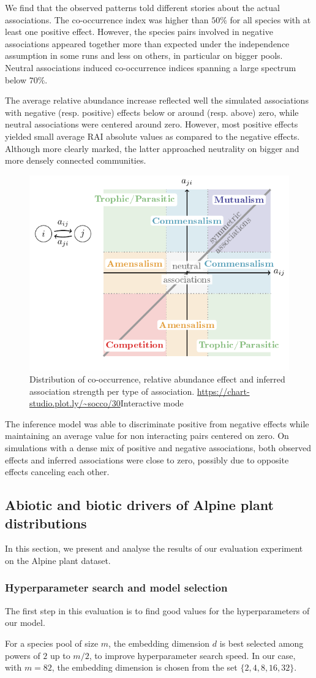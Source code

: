 \documentclass[10pt,a4paper]{article}
\newcommand{\inclPlt}[2]{\includegraphics[page=#1]{tikz_figures.pdf}}
\begin{document}
We find that the observed patterns told different stories about the actual associations. The co-occurrence index was higher than $50\%$ for all species with at least one positive effect. However, the species pairs involved in negative associations appeared together more than expected under the independence assumption in some runs and less on others, in particular on bigger pools. Neutral associations induced co-occurrence indices spanning a large spectrum below $70\%$. 

The average relative abundance increase reflected well the simulated associations with negative (resp. positive) effects below or around (resp. above) zero, while neutral associations were centered around zero. However, most positive effects yielded small average RAI absolute values as compared to the negative effects. Although more clearly marked, the latter approached neutrality on bigger and more densely connected communities.

\begin{figure}[bthp]
  \centering
    \inclPlt{6}{box_simul}
	\caption{Distribution of co-occurrence, relative abundance effect and inferred association strength per type of association. \url{https://chart-studio.plot.ly/~socco/30}{Interactive mode}}
	\label{patterns}
\end{figure}

The inference model was able to discriminate positive from negative effects while maintaining an average value for non interacting pairs centered on zero. On simulations with a dense mix of positive and negative associations, both observed effects and inferred associations were close to zero, possibly due to opposite effects canceling each other. 

\subsection{Abiotic and biotic drivers of Alpine plant distributions}

In this section, we present and analyse the results of our evaluation experiment on the Alpine plant dataset.

\subsubsection{Hyperparameter search and model selection}
The first step in this evaluation is to find good values for the hyperparameters of our model.

For a species pool of size $m$, the embedding dimension $d$ is best selected among powers of $2$ up to $m/2$, to improve hyperparameter search speed. In our case, with $m=82$, the embedding dimension is chosen from the set $\{2,4,8,16,32\}$. 
\end{document}
